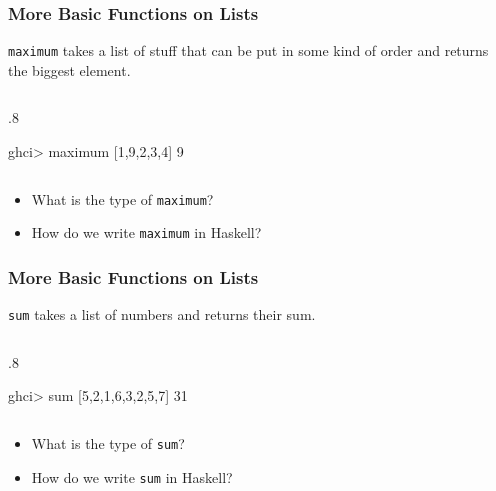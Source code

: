 \documentclass{beamer}
\newenvironment{codeblock}[1][.8]{%
\begin{columns}
\begin{column}{#1\linewidth}
\begin{exampleblock}{}}{%
\end{exampleblock}
\end{column}
\end{columns}}
\begin{document}
\begin{frame}[fragile]
\frametitle{More Basic Functions on Lists}

\verb+maximum+ takes a list of stuff that can be put in some kind of order and returns the biggest element.

\begin{codeblock}
\begin{hcode}
ghci> maximum [1,9,2,3,4]  
9   
\end{hcode}
\end{codeblock}

\begin{itemize}

\item What is the type of \verb+maximum+?

\item How do we write \verb+maximum+ in Haskell?

\end{itemize}

\end{frame}


\begin{frame}[fragile]
\frametitle{More Basic Functions on Lists}


\verb+sum+ takes a list of numbers and returns their sum.

\begin{codeblock}
\begin{hcode}
ghci> sum [5,2,1,6,3,2,5,7]  
31  
\end{hcode}
\end{codeblock}

\begin{itemize}

\item What is the type of \verb+sum+?

\item How do we write \verb+sum+ in Haskell?

\end{itemize}

\end{frame}

\end{document}
